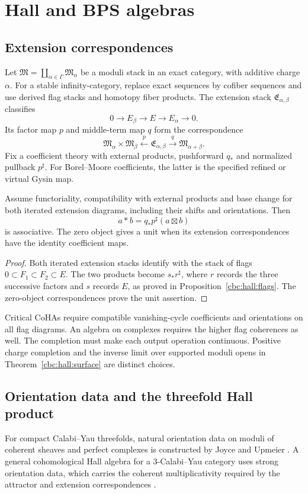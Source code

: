 \part{Hall and BPS algebras}

\chapter{Extension correspondences}
Let $\mathfrak M=\coprod_{\alpha\in\Gamma}\mathfrak M_\alpha$ be a moduli stack in an exact category, with additive charge $\alpha$.
For a stable infinity-category, replace exact sequences by cofiber sequences and use derived flag stacks and homotopy fiber products.
The extension stack $\mathfrak E_{\alpha,\beta}$ classifies
\[
 0\longrightarrow E_\beta\longrightarrow E
   \longrightarrow E_\alpha\longrightarrow0.
\]
Its factor map $p$ and middle-term map $q$ form the correspondence
\[
 \mathfrak M_\alpha\times\mathfrak M_\beta
 \xleftarrow{\ p\ }\mathfrak E_{\alpha,\beta}
 \xrightarrow{\ q\ }\mathfrak M_{\alpha+\beta}.
\]
Fix a coefficient theory with external products, pushforward $q_*$ and normalized pullback $p^\sharp$.
For Borel--Moore coefficients, the latter is the specified refined or virtual Gysin map.

\begin{theorem}
Assume functoriality, compatibility with external products and base change for both iterated extension diagrams, including their shifts and orientations.
Then
\[
 a*b=q_*p^\sharp(a\boxtimes b)
\]
is associative.
The zero object gives a unit when its extension correspondences have the identity coefficient maps.
\end{theorem}
\begin{proof}
Both iterated extension stacks identify with the stack of flags
$0\subset F_1\subset F_2\subset E$.
The two products become $s_*r^\sharp$, where $r$ records the three successive factors and $s$ records $E$, as proved in Proposition~\ref{cbc:hall:flags}.
The zero-object correspondences prove the unit assertion.
\end{proof}

Critical CoHAs require compatible vanishing-cycle coefficients and orientations on all flag diagrams.
An algebra on complexes requires the higher flag coherences as well.
The completion must make each output operation continuous.
Positive charge completion and the inverse limit over supported moduli opens in Theorem~\ref{cbc:hall:surface} are distinct choices.

\chapter{Orientation data and the threefold Hall product}
For compact Calabi--Yau threefolds, natural orientation data on moduli of coherent sheaves and perfect complexes is constructed by Joyce and Upmeier \cite{JoyceUpmeier}.  A general cohomological Hall algebra for a $3$-Calabi--Yau category uses strong orientation data, which carries the coherent multiplicativity required by the attractor and extension correspondences \cite{KPS}.

